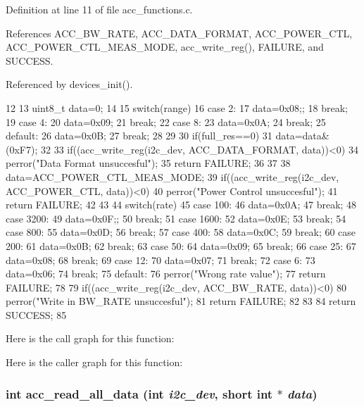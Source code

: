 Definition at line 11 of file acc\_\-functions.c.



References ACC\_\-BW\_\-RATE, ACC\_\-DATA\_\-FORMAT, ACC\_\-POWER\_\-CTL, ACC\_\-POWER\_\-CTL\_\-MEAS\_\-MODE, acc\_\-write\_\-reg(), FAILURE, and SUCCESS.



Referenced by devices\_\-init().




\begin{DoxyCode}
12 { 
13   uint8_t data=0;
14 
15   switch(range){
16     case 2:
17       data=0x08;;
18       break;
19     case 4:
20       data=0x09;
21       break;
22     case 8:
23       data=0x0A;
24       break;
25     default:
26       data=0x0B;
27       break;
28   }
29   
30   if(full_res==0)
31     data=data&(0xF7);
32   
33   if((acc_write_reg(i2c_dev, ACC_DATA_FORMAT, data))<0){
34     perror("Data Format unsuccesful");
35     return FAILURE;
36   }
37   
38   data=ACC_POWER_CTL_MEAS_MODE;
39   if((acc_write_reg(i2c_dev, ACC_POWER_CTL, data))<0){
40     perror("Power Control unsuccesful");
41     return FAILURE;
42   }
43   
44   switch(rate){
45     case 100:
46       data=0x0A;
47       break;
48     case 3200:
49       data=0x0F;;
50       break;
51     case 1600:
52       data=0x0E;
53       break;
54     case 800:
55       data=0x0D;
56       break;
57     case 400:
58       data=0x0C;
59       break;
60     case 200:
61       data=0x0B;
62       break;
63     case 50:
64       data=0x09;
65       break; 
66     case 25:
67       data=0x08;
68       break;
69     case 12:
70       data=0x07;
71       break;
72     case 6:
73       data=0x06;
74       break;
75     default:
76       perror("Wrong rate value");
77       return FAILURE;
78   }
79   if((acc_write_reg(i2c_dev, ACC_BW_RATE, data))<0){
80     perror("Write in BW_RATE unsuccesful");
81     return FAILURE;
82   }
83   
84   return SUCCESS;
85 }
\end{DoxyCode}




Here is the call graph for this function:



Here is the caller graph for this function:

\hypertarget{group__acc_ga013bb5ed8a763883fc440549d2b1a6ce}{
\subsubsection[{acc\_\-read\_\-all\_\-data}]{\setlength{\rightskip}{0pt plus 5cm}int acc\_\-read\_\-all\_\-data (int {\em i2c\_\-dev}, \/  short int $\ast$ {\em data})}}
\label{group__acc_ga013bb5ed8a763883fc440549d2b1a6ce}


